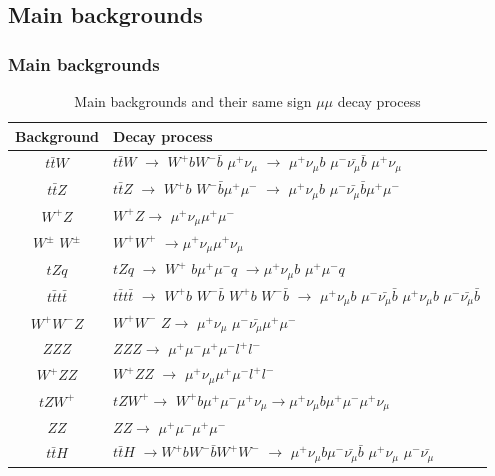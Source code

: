 \documentclass[11pt]{beamer}
\begin{document}
\begin{frame}\subsection{Main backgrounds}
\frametitle{Main backgrounds}
\tiny
\begin{table}
	\caption*{Main backgrounds and their same sign $\mu\mu$ decay process }
	\centering
	\begin{tabular}{|c|l|}
		\hline
		Background & Decay process \\
		\hline
		$t\bar{t}W$ &$t\bar{t}W$ $\rightarrow$ $W^+ b W^- \bar{b}$ $\mu^+\nu_\mu$ $\rightarrow$ $\mu^+ \nu_\mu b$ $\mu^- \bar{\nu_\mu} \bar{b}$ $\mu^+ \nu_\mu$\\
		\hline
		$t\bar{t} Z$ & $t\bar{t} Z$ $\rightarrow$ $W^+ b$ $W^-\bar{b} \mu^+ \mu^-$ $\rightarrow$ $\mu^+ \nu_\mu b$ $\mu^- \bar{\nu_\mu} \bar{b}\mu^+ \mu^-$ \\
		\hline
		$W^+ Z$ &$W^+ Z \rightarrow$ $\mu^+ \nu_\mu \mu^+ \mu^-$ \\
		\hline 
		$W^\pm$ $W^\pm$ & $W^+W^+$ $\rightarrow$$\mu^+\nu_\mu$$\mu^+ {\nu_\mu}$ \\
		\hline 
		$tZq$ & $tZq$ $\rightarrow$ $W^+$ $ b\mu^+ \mu^- q$ $\rightarrow$$\mu^+ \nu_\mu b$ $\mu^+\mu^- q$ \\
		\hline 
		$t\bar{t}t\bar{t}$ &$t\bar{t}t\bar{t}$ $\rightarrow$ $W^+ b$ $W^- \bar{b}$ $W^+ b$ $W^- \bar{b}$ $\rightarrow$ $\mu^+ \nu_\mu b$ $\mu^- \bar{\nu_\mu} \bar{b}$ $\mu^+ \nu_\mu b$ $\mu^- \bar{\nu_\mu} \bar{b}$ \\
		\hline 
		$W^+ W^- Z$ & $W^+ W^-$ $Z \rightarrow$ $\mu^+ \nu_\mu$ $\mu^- \bar{\nu_\mu} \mu^+ \mu^-$\\
		\hline 
		$ZZZ$ & $ZZZ \rightarrow$ $\mu^+ \mu^-\mu^+ \mu^-l^+ l^-$ \\
		\hline 
		$W^+ZZ$ &$W^+ZZ$ $\rightarrow$ $\mu^+ \nu_\mu \mu^+ \mu^- l^+l^-$ \\
		\hline 
		$tZW^+$ & $tZW^+ \rightarrow$ $W^+b \mu^+ \mu^- \mu^+ \nu_\mu \rightarrow \mu^+ \nu_\mu b \mu^+ \mu^- \mu^+ \nu_\mu$\\
		\hline
		$ZZ$ & $ZZ\rightarrow$ $\mu^+ \mu^- \mu^+ \mu^-$ \\
		\hline
		$t\bar{t}H$	& $t\bar{t}H$ $\rightarrow W^+b W^- \bar{b} W^+W^-$ $\rightarrow$ $\mu^+ \nu_\mu b$$\mu^- \bar{\nu_\mu}\bar{b}$ $\mu^+\nu_\mu$ $\mu^-\bar{\nu_\mu}$\\
		\hline 
	\end{tabular}
	\label{back}
\end{table} 
\end{frame}
\end{document}
